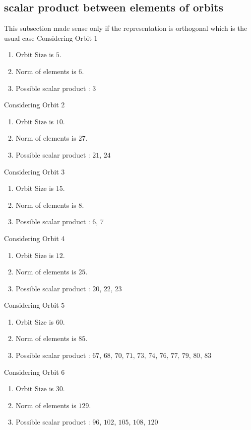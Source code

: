 \documentclass[12pt]{article}
\begin{document}
\subsection{scalar product between elements of orbits}
\noindent This subsection made sense only if the representation is orthogonal which is the usual case
Considering Orbit 1
\begin{enumerate}
\item Orbit Size is $5$.
\item Norm of elements is $6$.
\item Possible scalar product : $3$
\end{enumerate}
Considering Orbit 2
\begin{enumerate}
\item Orbit Size is $10$.
\item Norm of elements is $27$.
\item Possible scalar product : $21$, $24$
\end{enumerate}
Considering Orbit 3
\begin{enumerate}
\item Orbit Size is $15$.
\item Norm of elements is $8$.
\item Possible scalar product : $6$, $7$
\end{enumerate}
Considering Orbit 4
\begin{enumerate}
\item Orbit Size is $12$.
\item Norm of elements is $25$.
\item Possible scalar product : $20$, $22$, $23$
\end{enumerate}
Considering Orbit 5
\begin{enumerate}
\item Orbit Size is $60$.
\item Norm of elements is $85$.
\item Possible scalar product : $67$, $68$, $70$, $71$, $73$, $74$, $76$, $77$, $79$, $80$, $83$
\end{enumerate}
Considering Orbit 6
\begin{enumerate}
\item Orbit Size is $30$.
\item Norm of elements is $129$.
\item Possible scalar product : $96$, $102$, $105$, $108$, $120$
\end{enumerate}
\end{document}
